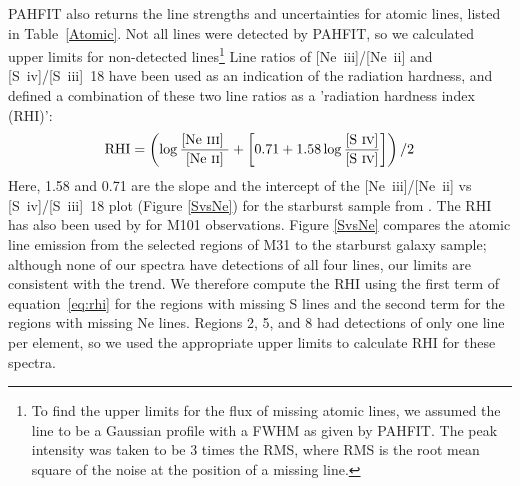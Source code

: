 PAHFIT also returns the line strengths and uncertainties for atomic lines, listed in Table~\ref{Atomic}.
Not all lines were detected by PAHFIT, so we calculated upper limits for non-detected lines\footnote{To find 
the upper limits for the flux of missing atomic lines, we assumed the line to be a 
Gaussian profile with a FWHM as given by PAHFIT. The peak intensity was taken to be 3 times the RMS, where RMS is the root mean square of 
the noise at the position of a missing line.}
Line ratios of [Ne~{\sc iii}]/[Ne~{\sc ii}] and [S~{\sc iv}]/[S~{\sc iii}]~18 have been used as an indication of the radiation hardness, and
\citet{Engelbracht_2008} defined a combination of these two line ratios as a 'radiation hardness index (RHI)':
%
\begin{equation}
{\rm RHI} = \left( \log\frac{\textrm{[Ne~{\sc iii}] }}{\textrm{[Ne~{\sc ii}]}} + \left[0.71 + 1.58\log\frac{\textrm{{[S~{\sc iv}]}}}{\textrm{{[S~{\sc iv}]}}}\right]\right) /2
\end{equation}
\label{eq:rhi}
%
Here, 1.58 and 0.71 are the slope and the intercept of the [Ne~{\sc iii}]/[Ne~{\sc ii}]  vs [S~{\sc iv}]/[S~{\sc iii}]~18 plot (Figure \ref{SvsNe}) for the starburst sample from 
\citet{Engelbracht_2008}. The RHI has also been used by \citet{Gordon:2008lr} for M101 observations. 
Figure \ref{SvsNe}  compares the atomic line emission from the selected regions of M31 to the starburst galaxy sample;
although none of our spectra have detections of all four lines, our limits are consistent with the trend.
We therefore compute the RHI using the first term of equation~\ref{eq:rhi} for the regions with missing S lines
and the second term for the regions with missing Ne lines.
Regions 2, 5, and 8 had detections of only one line per element, so we used the appropriate upper limits 
to calculate RHI for these spectra.

